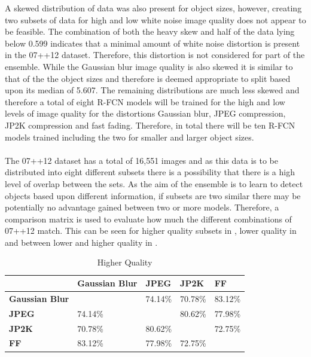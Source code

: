 A skewed distribution of data was also present for object sizes, however, creating two subsets of data for high and low white noise image quality does not appear to be feasible. The combination of both the heavy skew and half of the data lying below 0.599 indicates that a minimal amount of white noise distortion is present in the 07++12 dataset. Therefore, this distortion is not considered for part of the ensemble. While the Gaussian blur image quality is also skewed it is similar to that of the the object sizes and therefore is deemed appropriate to split based upon its median of 5.607. The remaining distributions are much less skewed and therefore a total of eight R-FCN models will be trained for the high and low levels of image quality for the distortions Gaussian blur, JPEG compression, JP2K compression and fast fading. Therefore, in total there will be ten R-FCN models trained including the two for smaller and larger object sizes.
\\\\
The 07++12 dataset has a total of 16,551 images and as this data is to be distributed into eight different subsets there is a possibility that there is a high level of overlap between the sets. As the aim of the ensemble is to learn to detect objects based upon different information, if subsets are two similar there may be potentially no advantage gained between two or more models. Therefore, a comparison matrix is used to evaluate how much the different combinations of 07++12 match. This can be seen for higher quality subsets in , lower quality in  and between lower and higher quality in .

\begin{table}[h]
\centering
\caption{Higher Quality}
\label{tab:highcomp}
\begin{tabular}{|l|l|l|l|l|}
\hline
             & \textbf{Gaussian Blur}  & \textbf{JPEG} & \textbf{JP2K} & \textbf{FF}    \\ \hline
\textbf{Gaussian Blur} &                & 74.14\% & 70.78\% & 83.12\% \\ \hline
\textbf{JPEG}   & 74.14\% &                & 80.62\% & 77.98\% \\ \hline
\textbf{JP2K}   & 70.78\%  & 80.62\% &                & 72.75\% \\ \hline
\textbf{FF}   & 83.12\% & 77.98\% & 72.75\% &                \\ \hline
\end{tabular}
\end{table}

